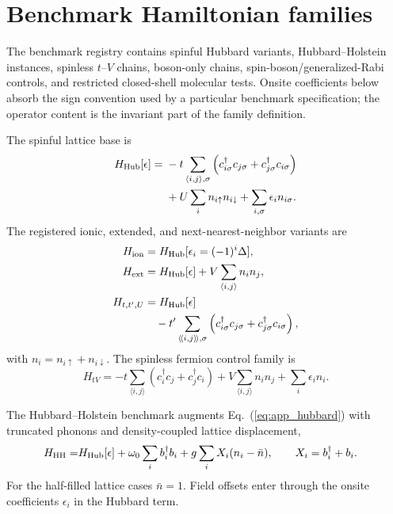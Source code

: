 \documentclass[
  reprint,
  amsmath,
  amssymb,
  aps,
  pra,
  nofootinbib,
  superscriptaddress,
  floatfix
]{revtex4-2}
\newcommand{\hh}{\mathrm{HH}}
\begin{document}
\section{Benchmark Hamiltonian families}
\label{app:hamiltonian_families}

The benchmark registry contains spinful Hubbard variants, Hubbard--Holstein instances, spinless $t$--$V$ chains, boson-only chains, spin-boson/generalized-Rabi controls, and restricted closed-shell molecular tests. Onsite coefficients below absorb the sign convention used by a particular benchmark specification; the operator content is the invariant part of the family definition.

The spinful lattice base is
\begin{align}
H_{\rm Hub}[\epsilon]={}&
-t\sum_{\langle i,j\rangle,\sigma}
\left(c_{i\sigma}^{\dagger}c_{j\sigma}
+c_{j\sigma}^{\dagger}c_{i\sigma}\right)
\nonumber\\
&
+U\sum_i n_{i\uparrow}n_{i\downarrow}
+\sum_{i,\sigma}\epsilon_i n_{i\sigma}.
\label{eq:app_hubbard}
\end{align}
The registered ionic, extended, and next-nearest-neighbor variants are
\begin{align}
H_{\rm ion}&=H_{\rm Hub}[\epsilon_i=(-1)^i\Delta],
\nonumber\\
H_{\rm ext}&=H_{\rm Hub}[\epsilon]+V\sum_{\langle i,j\rangle} n_i n_j,
\nonumber\\
H_{t,t',U}&=H_{\rm Hub}[\epsilon]
\nonumber\\
&\quad
-t'\sum_{\langle\!\langle i,j\rangle\!\rangle,\sigma}
\left(c_{i\sigma}^{\dagger}c_{j\sigma}
+c_{j\sigma}^{\dagger}c_{i\sigma}\right),
\label{eq:app_hubbard_variants}
\end{align}
with $n_i=n_{i\uparrow}+n_{i\downarrow}$. The spinless fermion control family is
\begin{equation}
H_{tV}=
-t\sum_{\langle i,j\rangle}
\left(c_i^\dagger c_j+c_j^\dagger c_i\right)
+V\sum_{\langle i,j\rangle}n_i n_j
+\sum_i\epsilon_i n_i .
\label{eq:app_spinless_tv}
\end{equation}

The Hubbard--Holstein benchmark augments Eq.~(\ref{eq:app_hubbard}) with truncated phonons and density-coupled lattice displacement,
\begin{align}
H_{\hh}=&H_{\rm Hub}[\epsilon]
+\omega_0\sum_i b_i^{\dagger}b_i
+g\sum_i X_i(n_i-\bar n),
\qquad
X_i=b_i^\dagger+b_i .
\label{eq:app_hh}
\end{align}
For the half-filled lattice cases $\bar n=1$. Field offsets enter through the onsite coefficients $\epsilon_i$ in the Hubbard term.
\end{document}
